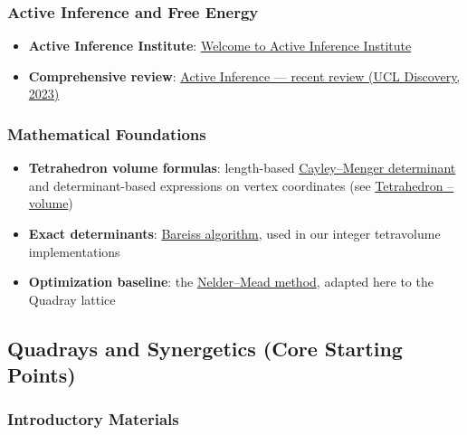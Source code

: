 \documentclass[
  10pt,
]{article}
\providecommand{\tightlist}{%
  \setlength{\itemsep}{0pt}\setlength{\parskip}{0pt}}
\begin{document}
\hypertarget{active-inference-and-free-energy-1}{%
\subsubsection{Active Inference and Free
Energy}\label{active-inference-and-free-energy-1}}

\begin{itemize}
\tightlist
\item
  \textbf{Active Inference Institute}:
  \href{https://welcome.activeinference.institute/}{Welcome to Active
  Inference Institute}
\item
  \textbf{Comprehensive review}:
  \href{https://discovery.ucl.ac.uk/id/eprint/10176959/1/1-s2.0-S1571064523001094-main.pdf}{Active
  Inference --- recent review (UCL Discovery, 2023)}
\end{itemize}

\hypertarget{mathematical-foundations-1}{%
\subsubsection{Mathematical
Foundations}\label{mathematical-foundations-1}}

\begin{itemize}
\tightlist
\item
  \textbf{Tetrahedron volume formulas}: length-based
  \href{https://en.wikipedia.org/wiki/Cayley\%E2\%80\%93Menger_determinant}{Cayley--Menger
  determinant} and determinant-based expressions on vertex coordinates
  (see
  \href{https://en.wikipedia.org/wiki/Tetrahedron\#Volume}{Tetrahedron
  -- volume})
\item
  \textbf{Exact determinants}:
  \href{https://en.wikipedia.org/wiki/Bareiss_algorithm}{Bareiss
  algorithm}, used in our integer tetravolume implementations
\item
  \textbf{Optimization baseline}: the
  \href{https://en.wikipedia.org/wiki/Nelder\%E2\%80\%93Mead_method}{Nelder--Mead
  method}, adapted here to the Quadray lattice
\end{itemize}

\hypertarget{quadrays-and-synergetics-core-starting-points}{%
\subsection{Quadrays and Synergetics (Core Starting
Points)}\label{quadrays-and-synergetics-core-starting-points}}

\hypertarget{introductory-materials}{%
\subsubsection{Introductory Materials}\label{introductory-materials}}
\end{document}
